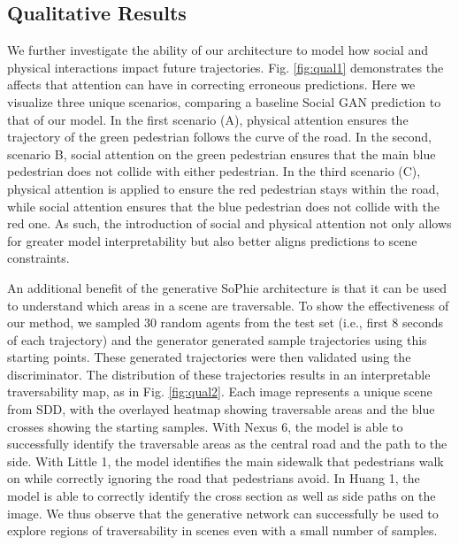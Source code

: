 \documentclass[10pt,twocolumn,letterpaper]{article}
\begin{document}
\subsection{Qualitative Results}

We further investigate the ability of our architecture to model how social and physical interactions impact future trajectories. Fig. \ref{fig:qual1} demonstrates the affects that attention can have in correcting erroneous predictions. Here we visualize three unique scenarios, comparing a baseline Social GAN prediction to that of our model. In the first scenario (A), physical attention ensures the trajectory of the green pedestrian follows the curve of the road. In the second, scenario B, social attention on the green pedestrian ensures that the main blue pedestrian does not collide with either pedestrian. In the third scenario (C), physical attention is applied to ensure the red pedestrian stays within the road, while social attention ensures that the blue pedestrian does not collide with the red one. As such, the introduction of social and physical attention not only allows for greater model interpretability but also better aligns predictions to scene constraints. 

An additional benefit of the generative SoPhie architecture is that it can be used to understand which areas in a scene are traversable.
To show the effectiveness of our method, we sampled 30 random agents from the test set (i.e., first 8 seconds of each trajectory)
and the generator generated sample trajectories using this starting points. These generated trajectories were then validated using the discriminator. The distribution of these trajectories results in an interpretable traversability map, as in Fig. \ref{fig:qual2}. Each image represents a unique scene from SDD, with the overlayed heatmap showing traversable areas and the blue crosses showing the starting samples. With Nexus 6, the model is able to successfully identify the traversable areas as the central road and the path to the side. With Little 1, the model identifies the main sidewalk that pedestrians walk on while correctly ignoring the road that pedestrians avoid. In Huang 1, the model is able to correctly identify the cross section as well as side paths on the image. We thus observe that the generative network can successfully be used to explore regions of traversability in scenes even with a small number of samples. 
\end{document}
